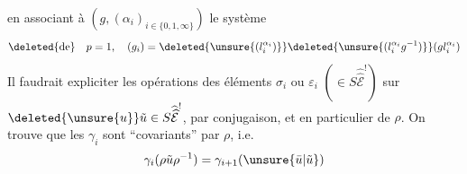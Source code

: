en associant à $(g,(\alpha_i)_{i\in\{0,1,\infty\}})$ le système
\[
\deleted{\text{de}}\quad p=1,\quad(g_i)=\deleted{\unsure{(l_i^{\alpha_i})}}\deleted{\unsure{(l_i^{\alpha_i}g^{-1})}}(gl_i^{\alpha_i})
\]
Il faudrait expliciter les opérations des éléments $\sigma_i$ ou $\varepsilon_i$  $(\in S\widehat{\widehat{\mathcal E}}^!)$ sur $\deleted{\unsure{u}}\tilde u\in S\widehat{\widehat{\mathcal E}}^!$, par  conjugaison, et en particulier de $\rho$. On trouve que  les $\gamma_i$ sont ``covariants'' par $\rho$, i.e.
\[
\gamma_i(\rho\tilde u\rho^{-1})=\gamma_{i+1}(\unsure{\bar u|\tilde u})
\]
